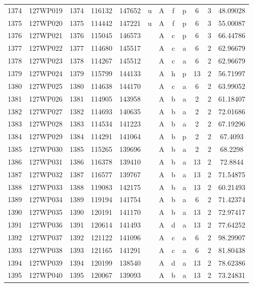 \begin{tabular}{|*{12}{c|}}
1374 & 127WP019 & 1374 & 116132 & 147652 & u & A & f & p & 6 & 3 & 48.09028 \\ 
1375 & 127WP020 & 1375 & 114442 & 147221 & u & A & f & p & 6 & 3 & 55.00087 \\ 
1376 & 127WP021 & 1376 & 115045 & 146573 &  & A & c & p & 6 & 3 & 66.44786 \\ 
1377 & 127WP022 & 1377 & 114680 & 145517 &  & A & c & a & 6 & 2 & 62.96679 \\ 
1378 & 127WP023 & 1378 & 114267 & 145512 &  & A & c & a & 6 & 2 & 62.96679 \\ 
1379 & 127WP024 & 1379 & 115799 & 144133 &  & A & h & p & 13 & 2 & 56.71997 \\ 
1380 & 127WP025 & 1380 & 114638 & 144170 &  & A & c & a & 6 & 2 & 63.99052 \\ 
1381 & 127WP026 & 1381 & 114905 & 143958 &  & A & b & a & 2 & 2 & 61.18407 \\ 
1382 & 127WP027 & 1382 & 114693 & 140635 &  & A & b & a & 2 & 2 & 72.01686 \\ 
1383 & 127WP028 & 1383 & 114534 & 141223 &  & A & b & a & 2 & 2 & 67.19296 \\ 
1384 & 127WP029 & 1384 & 114291 & 141064 &  & A & b & p & 2 & 2 & 67.4093 \\ 
1385 & 127WP030 & 1385 & 115265 & 139696 &  & A & b & a & 2 & 2 & 68.2298 \\ 
1386 & 127WP031 & 1386 & 116378 & 139410 &  & A & b & a & 13 & 2 & 72.8844 \\ 
1387 & 127WP032 & 1387 & 116577 & 139767 &  & A & b & a & 13 & 2 & 71.54875 \\ 
1388 & 127WP033 & 1388 & 119083 & 142175 &  & A & b & a & 13 & 2 & 60.21493 \\ 
1389 & 127WP034 & 1389 & 119194 & 141754 &  & A & b & a & 6 & 2 & 71.42374 \\ 
1390 & 127WP035 & 1390 & 120191 & 141170 &  & A & b & a & 13 & 2 & 72.97417 \\ 
1391 & 127WP036 & 1391 & 120614 & 141493 &  & A & d & a & 13 & 2 & 77.64252 \\ 
1392 & 127WP037 & 1392 & 121122 & 141096 &  & A & c & a & 6 & 2 & 98.29907 \\ 
1393 & 127WP038 & 1393 & 121165 & 141291 &  & A & c & a & 6 & 2 & 81.80438 \\ 
1394 & 127WP039 & 1394 & 120199 & 138540 &  & A & d & a & 13 & 2 & 78.62386 \\ 
1395 & 127WP040 & 1395 & 120067 & 139093 &  & A & b & a & 13 & 2 & 73.24831 \\ 

\end{tabular}
